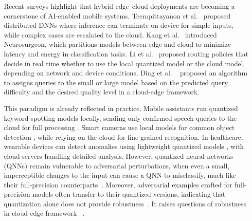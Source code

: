 \documentclass[11pt]{article}
\begin{document}
Recent surveys \cite{satyanarayanan2017emergence,shi2016edge,mao2017survey} highlight
that hybrid edge–cloud deployments are becoming a cornerstone of
AI-enabled mobile systems. Teerapittayanon et
al.~\cite{teerapittayanon2017distributed} proposed distributed DNNs
where inference can terminate on-device for simple inputs, while complex
cases are escalated to the cloud. Kang et al.~\cite{kang2017neurosurgeon}
introduced Neurosurgeon, which partitions models between edge and
cloud to minimize latency and energy in classification tasks.
Li et al.~\cite{li2018edge} proposed routing policies that decide in
real time whether to use the local quantized model or the cloud model,
depending on network and device conditions. Ding et al. ~\cite{ding2024hybridllm} proposed an algorithm to assigns queries to the small or large model
based on the predicted query difficulty and the desired quality level in a cloud-edge framework.

This paradigm is already reflected in practice. Mobile assistants run
quantized keyword-spotting models locally, sending only confirmed speech
queries to the cloud for full processing \cite{alvarez2016energy}.
Smart cameras use local models for common object detection
\cite{cao2021edgecloud}, while relying on the cloud for
fine-grained recognition. In healthcare, wearable devices can detect
anomalies using lightweight quantized models \cite{xu2019edge}, with
cloud servers handling detailed analysis.
However, quantized neural networks (QNNs) remain vulnerable to adversarial perturbations, when even a small,
imperceptible changes to the input can cause a QNN to misclassify, much like
their full-precision counterparts~\cite{tramer2017space,lin2019defensive}.
Moreover, adversarial examples crafted for full-precision models often transfer to their quantized versions, indicating that quantization alone does
not provide robustness~\cite{zhao2019adversarial}.
It raises questions of robustness in cloud-edge framework ~\cite{hao2022diva}.

\begin{comment}
Adversarial inputs generated against the edge model can frequently transfer to
the cloud model, leading the entire system to misclassify perturbed inputs in
the same way it misclassifies them locally~\cite{tramer2017space,lin2019defensive}.
Such transferability undermines the intended complementarity of the two models,
as both become susceptible to the same adversarial examples.
\end{comment}
\end{document}
